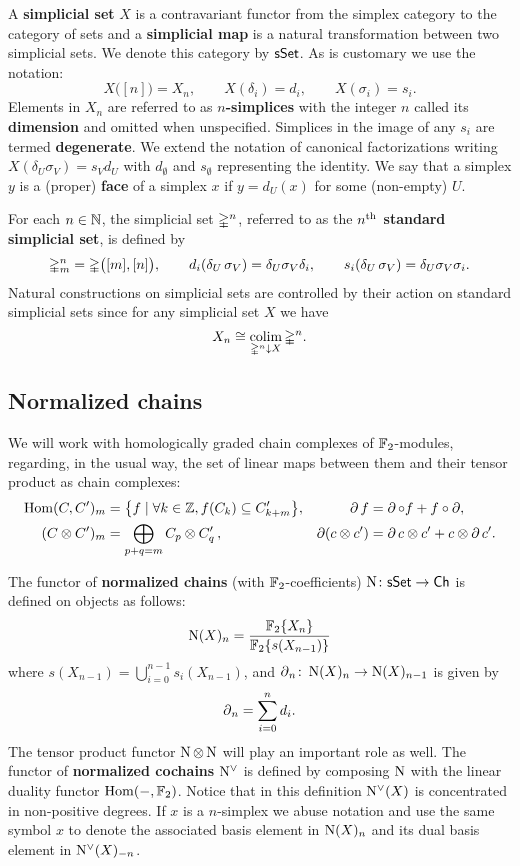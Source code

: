 A \textbf{simplicial set} $X$ is a contravariant functor from the simplex category to the category of sets and a \textbf{simplicial map} is a natural transformation between two simplicial sets.
We denote this category by $\mathsf{sSet}$.
As is customary we use the notation:
\[
X \big( [n] \big) = X_n, \qquad
X(\delta_i) = d_i, \qquad
X(\sigma_i) = s_i.
\]
Elements in $X_n$ are referred to as \mbox{\textbf{$n$-simplices}} with the integer $n$ called its \textbf{dimension} and omitted when unspecified.
Simplices in the image of any $s_i$ are termed \textbf{degenerate}.
We extend the notation of canonical factorizations writing $X(\delta_U \sigma_V) = s_V d_U$ with $d_\emptyset$ and $s_\emptyset$ representing the identity.
We say that a simplex $y$ is a (proper) \textbf{face} of a simplex $x$ if $y = d_U(x)$ for some (non-empty) $U$.

For each $n \in \mathbb{N}$, the simplicial set $\mathbb{\Delta}^n$, referred to as the \textbf{$n^{\mathrm{th}}$ standard simplicial set}, is defined by
\[
\mathbb{\Delta}^n_m = \mathbb{\Delta} \big( [m], [n] \big), \qquad
d_i(\delta_U\, \sigma_V) = \delta_U \sigma_V \delta_i, \qquad
s_i(\delta_U\, \sigma_V) = \delta_U \sigma_V \sigma_i.
\]
Natural constructions on simplicial sets are controlled by their action on standard simplicial sets since for any simplicial set $X$ we have
\[
X_n \cong \operatorname*{colim}_{\mathbb{\Delta}^n \downarrow X} \mathbb{\Delta}^n.
\]

\subsection{Normalized chains}

We will work with homologically graded chain complexes of ${\mathbb{F}_2}$-modules, regarding, in the usual way, the set of linear maps between them and their tensor product as chain complexes:
\begin{align*}
\mathrm{Hom}(C, C^\prime)_m &= \big\{f \mid \forall k \in \mathbb{Z}, f(C_k) \subseteq C^\prime_{k+m} \big\},
&\operatorname{\partial} f &= \operatorname{\partial} \circ f + f \circ \operatorname{\partial}, \\
(C \otimes C^\prime)_m &= \bigoplus_{p + q = m} C_p \otimes C^\prime_q \,,
&\operatorname{\partial} (c \otimes c^\prime) &= \operatorname{\partial} c \otimes c^\prime + c \otimes \operatorname{\partial} c^\prime.
\end{align*}

The functor of \textbf{normalized chains} (with ${\mathbb{F}_2}$-coefficients) $\operatorname{N} \colon \mathsf{sSet} \to \mathsf{Ch}$ is defined on objects as follows:
\[
\operatorname{N}(X)_n = \frac{{\mathbb{F}_2} \{ X_n \}}{{\mathbb{F}_2} \{ s(X_{n-1}) \}}
\]
where $s(X_{n-1}) = \bigcup_{i=0}^{n-1} s_i(X_{n-1})$, and $\operatorname{\partial}_n \colon \operatorname{N}(X)_n \to \operatorname{N}(X)_{n-1}$ is given by
\[
\operatorname{\partial}_n = \sum_{i = 0}^{n} d_{i}.
\]
The tensor product functor $\operatorname{N} \otimes \operatorname{N}$ will play an important role as well.
The functor of \textbf{normalized cochains} $\operatorname{N^{\vee}}$ is defined by composing $\operatorname{N}$ with the linear duality functor $\mathrm{Hom}(-, {\mathbb{F}_2})$.
Notice that in this definition $\operatorname{N^{\vee}}(X)$ is concentrated in non-positive degrees.
If $x$ is a $n$-simplex we abuse notation and use the same symbol $x$ to denote the associated basis element in $\operatorname{N}(X)_n$ and its dual basis element in $\operatorname{N^{\vee}}(X)_{-n}$.